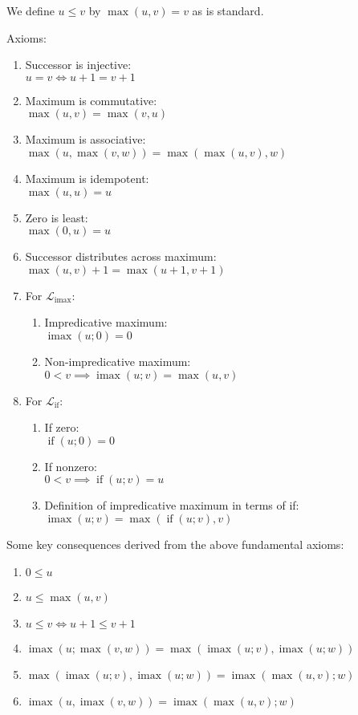 \documentclass[11pt, twoside, reqno]{book}
\DeclareMathOperator{\imax}{imax}
\DeclareMathOperator{\ifop}{if}
\begin{document}
We define \(u \le v\) by \(\max(u, v) = v\) as is standard.

Axioms:
\label{alg-uni-laws}
\begin{enumerate}
\item Successor is injective:\\
  \(u = v \iff u+1 = v+1\)
\item Maximum is commutative:\\
  \(\max(u, v) = \max(v, u)\)
\item Maximum is associative:\\
  \(\max(u, \max(v, w)) = \max(\max(u, v), w)\)
\item Maximum is idempotent:\\
  \(\max(u, u) = u\)
\item Zero is least:\\
  \(\max(0, u) = u\)
\item Successor distributes across maximum:\\
  \(\max(u, v) + 1 = \max(u + 1, v + 1)\)
\item For \(\mathcal{L}_{\imax}\):
\begin{enumerate}
\item Impredicative maximum:\\
  \(\imax(u; 0) = 0\)
\item Non-impredicative maximum:\\
  \(0 < v \implies \imax(u; v) = \max(u, v)\)
\end{enumerate}
\item For \(\mathcal{L}_{\ifop}\):
\begin{enumerate}
\item If zero:\\
  \(\ifop(u; 0) = 0\)
\item If nonzero:\\
  \(0 < v \implies \ifop(u; v) = u\)
\item Definition of impredicative maximum in terms of if:\\
  \(\imax(u; v) = \max(\ifop(u; v), v)\)
\end{enumerate}
\end{enumerate}

Some key consequences derived from the above fundamental axioms:
\label{alg-uni-laws-more}
\begin{enumerate}
\item \(0 \le u\)
\item \(u \le \max(u, v)\)
\item \(u \le v \iff u+1 \le v+1\)
\item \(\imax(u; \max(v, w)) = \max(\imax(u; v), \imax(u; w))\)
\item \(\max(\imax(u; v), \imax(u; w)) = \imax(\max(u, v); w)\)
\item \(\imax(u, \imax(v, w)) = \imax(\max(u, v); w)\)
\end{enumerate}
\end{document}
